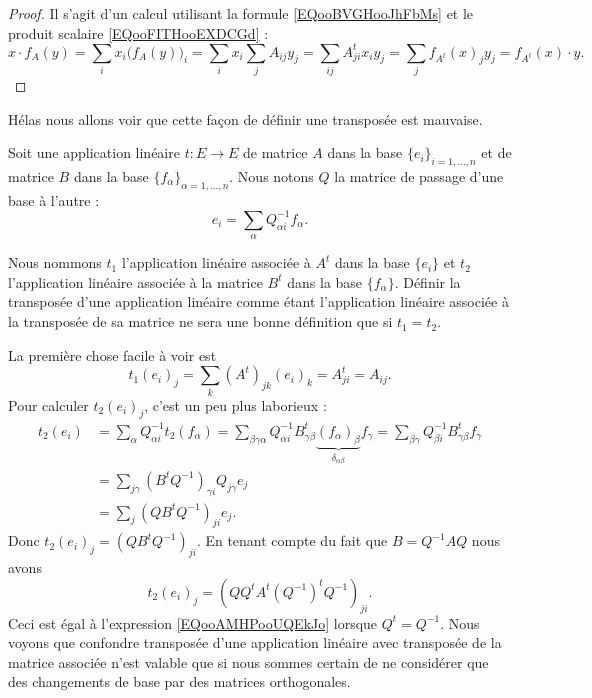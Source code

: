 \begin{proof}
	Il s'agit d'un calcul utilisant la formule \eqref{EQooBVGHooJhFbMs} et le produit scalaire \eqref{EQooFITHooEXDCGd} :
	\begin{equation}
		x\cdot f_A(y)=\sum_ix_i\big( f_A(y) \big)_i=\sum_ix_i\sum_jA_{ij}y_j=\sum_{ij}A^t_{ji}x_iy_j=\sum_jf_{A^t}(x)_jy_j=f_{A^t}(x)\cdot y.
	\end{equation}
\end{proof}

Hélas nous allons voir que cette façon de définir une transposée est mauvaise.

Soit une application linéaire \( t\colon E\to E\) de matrice \( A\) dans la base \( \{ e_i \}_{i=1,\ldots, n}\) et de matrice \( B\) dans la base \( \{ f_{\alpha} \}_{\alpha=1,\ldots, n}\). Nous notons \( Q\) la matrice de passage d'une base à l'autre :
\begin{equation}
	e_i=\sum_{\alpha}Q_{\alpha i}^{-1}f_{\alpha}.
\end{equation}

Nous nommons \( t_1\) l'application linéaire associée à \( A^t\) dans la base \( \{ e_i \}\) et \( t_2\) l'application linéaire associée à la matrice \( B^t\) dans la base \( \{ f_{\alpha} \}\). Définir la transposée d'une application linéaire comme étant l'application linéaire associée à la transposée de sa matrice ne sera une bonne définition que si \( t_1=t_2\).

La première chose facile à voir est
\begin{equation}        \label{EQooAMHPooUQEkJo}
	t_1(e_i)_j=\sum_k(A^t)_{jk}(e_i)_k=A^t_{ji}=A_{ij}.
\end{equation}
Pour calculer \( t_2(e_i)_j\), c'est un peu plus laborieux :
\begin{subequations}
	\begin{align}
		t_2(e_i) & =\sum_{\alpha}Q_{\alpha i}^{-1} t_2(f_\alpha)=\sum_{\beta\gamma\alpha}Q_{\alpha i}^{-1}B^t_{\gamma\beta}\underbrace{(f_{\alpha})_{\beta}}_{\delta_{\alpha\beta}}f_{\gamma}=\sum_{\beta\gamma}Q_{\beta i}^{-1}B^t_{\gamma\beta}f_{\gamma} \\
		         & =\sum_{j\gamma}(B^tQ^{-1})_{\gamma i}Q_{j\gamma}e_j                                                                                                                                                                                      \\
		         & =\sum_j(QB^tQ^{-1})_{ji}e_j.
	\end{align}
\end{subequations}
Donc \( t_2(e_i)_j=(QB^tQ^{-1})_{ji}\). En tenant compte du fait que \( B=Q^{-1}AQ\) nous avons
\begin{equation}
	t_2(e_i)_j=(QQ^tA^t(Q^{-1})^tQ^{-1})_{ji}.
\end{equation}
Ceci est égal à l'expression \eqref{EQooAMHPooUQEkJo} lorsque \( Q^t=Q^{-1}\). Nous voyons que confondre transposée d'une application linéaire avec transposée de la matrice associée n'est valable que si nous sommes certain de ne considérer que des changements de base par des matrices orthogonales.

